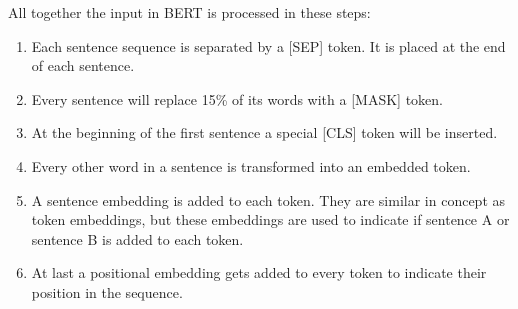 All together the input in BERT is processed in these steps:
\begin{enumerate}
    \item Each sentence sequence is separated by a [SEP] token. It is placed at the end of each sentence.
    \item Every sentence will replace 15\% of its words with a [MASK] token.
    \item At the beginning of the first sentence a special [CLS] token will be inserted.
    \item Every other word in a sentence is transformed into an embedded token.
    \item A sentence embedding is added to each token. They are similar in concept as token embeddings, but these embeddings are used to indicate if sentence A or sentence B is added to each token.
    \item At last a positional embedding gets added to every token to indicate their position in the sequence.
\end{enumerate}
